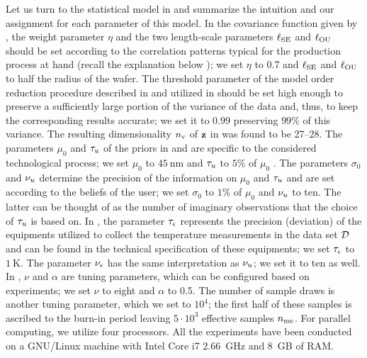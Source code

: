 Let us turn to the statistical model in  and summarize the intuition and our assignment for each parameter of this model.
In the covariance function given by , the weight parameter $\eta$ and the two length-scale parameters $\ell_{\text{SE}}$ and $\ell_{\text{OU}}$ should be set according to the correlation patterns typical for the production process at hand \cite{chandrakasan2001, cheng2011} (recall the explanation below ); we set $\eta$ to 0.7 and $\ell_{\text{SE}}$ and $\ell_{\text{OU}}$ to half the radius of the wafer.
The threshold parameter of the model order reduction procedure described in  and utilized in  should be set high enough to preserve a sufficiently large portion of the variance of the data and, thus, to keep the corresponding results accurate; we set it to $0.99$ preserving $99\%$ of this variance. The resulting dimensionality ${n_\text{v}}$ of $\mathbf{z}$ in  was found to be 27--28.
The parameters $\mu_0$ and $\tau_u$ of the priors in  and  are specific to the considered technological process; we set $\mu_0$ to $45~\text{nm}$ and $\tau_u$ to $5\%$ of $\mu_0$ \cite{juan2011, juan2012}.
The parameters $\sigma_0$ and $\nu_u$ determine the precision of the information on $\mu_0$ and $\tau_u$ and are set according to the beliefs of the user; we set $\sigma_0$ to $1\%$ of $\mu_0$ and $\nu_u$ to ten.
The latter can be thought of as the number of imaginary observations that the choice of $\tau_u$ is based on.
In , the parameter $\tau_\epsilon$ represents the precision (deviation) of the equipments utilized to collect the temperature measurements in the data set $\mathcal{D}$ and can be found in the technical specification of these equipments; we set $\tau_\epsilon$ to $1~\text{K}$. The parameter $\nu_\epsilon$ has the same interpretation as $\nu_u$; we set it to ten as well.
In , $\nu$ and $\alpha$ are tuning parameters, which can be configured based on experiments; we set $\nu$ to eight and $\alpha$ to 0.5.
The number of sample draws is another tuning parameter, which we set to $10^4$; the first half of these samples is ascribed to the burn-in period leaving $5 \cdot 10^3$ effective samples ${n_\text{mc}}$.
For parallel computing, we utilize four processors. All the experiments have been conducted on a GNU/Linux machine with Intel Core i7 2.66~GHz and 8~GB of RAM.


